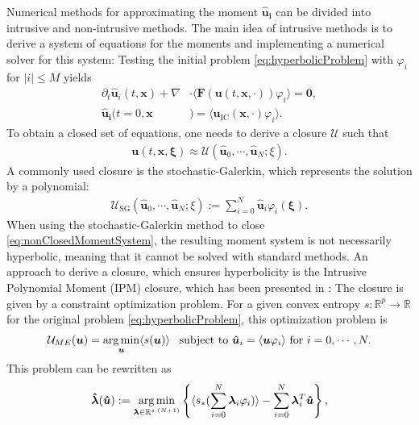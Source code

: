 Numerical methods for approximating the moment $\bm{\hat u_i}$ can be divided into intrusive and non-intrusive methods. The main idea of intrusive methods is to derive a system of equations for the moments and implementing a numerical solver for this system: Testing the initial problem \eqref{eq:hyperbolicProblem} with $\varphi_i$ for $|i|\leq M$ yields
\begin{subequations}\label{eq:nonClosedMomentSystem}
\begin{align}
\partial_t \bm{\hat u}_i(t,\bm{x}) + \nabla&\cdot\langle\bm{F}(\bm{u}(t,\bm{x},\cdot)) \varphi_i\rangle = \bm{0}, \\
\bm{\hat u_i}(t=0,\bm{x}&) = \langle\bm{u}_{\text{IC}}(\bm{x},\cdot)\varphi_i\rangle.
\end{align}
\end{subequations}
To obtain a closed set of equations, one needs to derive a closure $\mathcal{U}$ such that 
\begin{align*}
\bm{u}(t,\bm x,\bm \xi) \approx \mathcal{U}(\bm{\hat u}_0,\cdots,\bm{\hat u}_N;\xi).
\end{align*}
A commonly used closure is the stochastic-Galerkin, which represents the solution by a polynomial:
\begin{align*}
\mathcal{U}_{\text{SG}}(\bm{\hat u}_0,\cdots,\bm{\hat u}_N;\xi):= \sum_{i=0}^N \bm{\hat{u}}_i\varphi_i(\bm{\xi}).
\end{align*}
When using the stochastic-Galerkin method to close \eqref{eq:nonClosedMomentSystem}, the resulting moment system is not necessarily hyperbolic, meaning that it cannot be solved with standard methods. An approach to derive a closure, which ensures hyperbolicity is the Intrusive Polynomial Moment (IPM) closure, which has been presented in \cite{poette2009uncertainty}: The closure is given by a constraint optimization problem. For a given convex entropy $s:\mathbb{R}^p\to\mathbb{R}$ for the original problem \eqref{eq:hyperbolicProblem}, this optimization problem is
\begin{align}\label{eq:primalProblem}
\mathcal{U}_{ME}(\bm{u}) = \operatorname*{arg\,min}_{\bm u} \langle s(\bm u) \rangle \enskip \text{ subject to } \bm{\hat u}_i = \langle \bm u \varphi_i \rangle \text{ for } i = 0,\cdots,N.
\end{align}
This problem can be rewritten as
\begin{align}\label{eq:dualProblem}
 \bm{\hat \lambda}(\bm{\hat u}) := \operatorname*{arg\,min}_{\bm{\lambda} \in \mathbb{R}^{s\cdot(N + 1)}}
  \left\{\langle s_*(\sum_{i=0}^{N}\bm{\lambda}_i \varphi_i)\rangle - \sum_{i=0}^{N}\bm{\lambda}_i^T \bm{\hat u}\right\},
\end{align}
